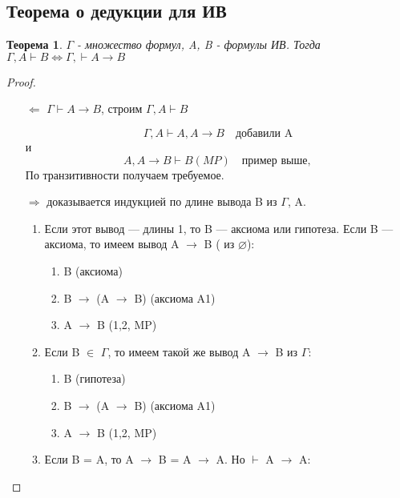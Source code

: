 \documentclass[a4paper]{article}
\newtheorem{theorem}{Теорема}[section]
\theoremstyle{definition}
\theoremstyle{remark}
\begin{document}
    \subsection{Теорема о дедукции для ИВ}
    \begin{theorem}
        $\Gamma$ - множество формул, A, B - формулы ИВ. Тогда
        $\Gamma, A\vdash B \Leftrightarrow \Gamma, \vdash A\rightarrow B$
    \end{theorem}
    \begin{proof}
        \begin{itemize}
            \item[$\Leftarrow$]$\Gamma \vdash A\rightarrow B$, строим $\Gamma, A\vdash B$
            
            $$\Gamma,  A\vdash A, A\rightarrow B \quad\text{добавили A}$$ и $$A, A\rightarrow B \vdash B (MP) \quad\text{пример выше},$$
            По транзитивности получаем требуемое.
            \item[$\Rightarrow$] 
            доказывается индукцией по длине вывода B из $\Gamma$, A.
            \begin{enumerate}
                \item Если этот вывод — длины 1, то B — аксиома или гипотеза. Если B
                — аксиома, то имеем вывод A $\rightarrow$ B ( из $\varnothing$):
                \begin{enumerate}
                    \item B (аксиома)
                    \item B $\rightarrow$ (A $\rightarrow$ B) (аксиома A1)
                    \item A $\rightarrow$ B (1,2, MP)
                \end{enumerate}
                \item Если B $\in$ $\Gamma$, то имеем такой же вывод A $\rightarrow$ B из $\Gamma$:
                \begin{enumerate}
                    \item B (гипотеза)
                    \item B $\rightarrow$ (A $\rightarrow$ B) (аксиома A1)
                    \item A $\rightarrow$ B (1,2, MP)
                \end{enumerate}
                \item Если B = A, то A $\rightarrow$ B = A $\rightarrow$ A. Но $\vdash$ A $\rightarrow$ A:
                    \begin{enumerate}

\end{enumerate}
\end{enumerate}
\end{itemize}
\end{proof}
\end{document}
